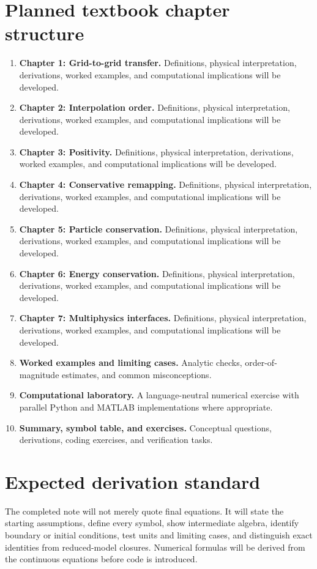\documentclass[11pt]{article}
\begin{document}
\section{Planned textbook chapter structure}
\begin{enumerate}[leftmargin=1.8em]
\item \textbf{Chapter 1: Grid-to-grid transfer.} Definitions, physical interpretation, derivations, worked examples, and computational implications will be developed.
\item \textbf{Chapter 2: Interpolation order.} Definitions, physical interpretation, derivations, worked examples, and computational implications will be developed.
\item \textbf{Chapter 3: Positivity.} Definitions, physical interpretation, derivations, worked examples, and computational implications will be developed.
\item \textbf{Chapter 4: Conservative remapping.} Definitions, physical interpretation, derivations, worked examples, and computational implications will be developed.
\item \textbf{Chapter 5: Particle conservation.} Definitions, physical interpretation, derivations, worked examples, and computational implications will be developed.
\item \textbf{Chapter 6: Energy conservation.} Definitions, physical interpretation, derivations, worked examples, and computational implications will be developed.
\item \textbf{Chapter 7: Multiphysics interfaces.} Definitions, physical interpretation, derivations, worked examples, and computational implications will be developed.
\item \textbf{Worked examples and limiting cases.} Analytic checks, order-of-magnitude estimates, and common misconceptions.
\item \textbf{Computational laboratory.} A language-neutral numerical exercise with parallel Python and MATLAB implementations where appropriate.
\item \textbf{Summary, symbol table, and exercises.} Conceptual questions, derivations, coding exercises, and verification tasks.
\end{enumerate}

\section{Expected derivation standard}
The completed note will not merely quote final equations. It will state the starting assumptions, define every symbol, show intermediate algebra, identify boundary or initial conditions, test units and limiting cases, and distinguish exact identities from reduced-model closures. Numerical formulas will be derived from the continuous equations before code is introduced.
\end{document}
